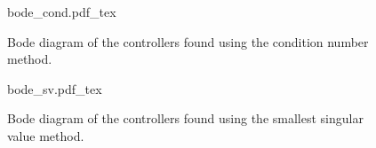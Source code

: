 \begin{figure}[h!]
  \centering
  \def\svgwidth{\columnwidth}
  {\footnotesize{bode_cond.pdf_tex}}
  \caption{\label{fig:bode_cond} Bode diagram of the controllers found using the condition number method.}
\end{figure}

\begin{figure}[h!]
  \centering
  \def\svgwidth{\columnwidth}
  {\footnotesize{bode_sv.pdf_tex}}
  \caption{\label{fig:bode_sv} Bode diagram of the controllers found using the smallest singular value method.}
\end{figure}




